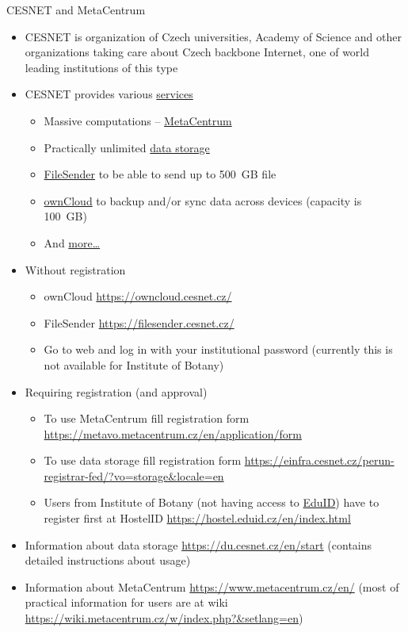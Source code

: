 \documentclass[compress, ucs, xelatex, 11pt, xcolor=svgnames,
  hyperref={
    bookmarks=true,
    unicode=true,
    colorlinks=true,
    pdftitle={Linux, command line and MetaCentrum},
    plainpages=false,
    pdfauthor={Vojtech Zeisek},
    pdfsubject={Course about use of Linux command line, writing shell scripts and using MetaCentrum of CESNET},
    pdfcreator={XeLaTeX},
    pdfkeywords={Linux, GNU, BASH, shell, command line, MetaCentrum},
    linkcolor=Red,
    anchorcolor=Blue,
    citecolor=Purple,
    filecolor=DodgerBlue,
    menucolor=DarkOrchid,
    urlcolor=DeepSkyBlue,
    pdftex},
  url={hyphens, lowtilde} %
  ]{beamer}
\begin{document}
\begin{frame}[allowframebreaks]{CESNET and MetaCentrum}
\begin{itemize}
  \item CESNET is organization of Czech universities, Academy of Science and other organizations taking care about Czech backbone Internet, one of world leading institutions of this type
  \item CESNET provides various \href{https://www.cesnet.cz/services/?lang=en}{services}
  \begin{itemize}
    \item Massive computations -- \href{https://www.cesnet.cz/services/massive-computations-metacentrum/?lang=en}{MetaCentrum}
    \item Practically unlimited \href{https://www.cesnet.cz/services/data-storage/?lang=en}{data storage}
    \item \href{https://www.cesnet.cz/services/filesender/?lang=en}{FileSender} to be able to send up to 500~GB file
    \item \href{https://www.cesnet.cz/services/owncloud/?lang=en}{ownCloud} to backup and/or sync data across devices (capacity is 100~GB)
    \item And \href{https://www.cesnet.cz/services/?lang=en}{more\ldots}
  \end{itemize}
  \item Without registration
  \begin{itemize}
    \item ownCloud \url{https://owncloud.cesnet.cz/}
    \item FileSender \url{https://filesender.cesnet.cz/}
    \item Go to web and log in with your institutional password (currently this is not available for Institute of Botany)
  \end{itemize}
  \item Requiring registration (and approval)
  \begin{itemize}
    \item To use MetaCentrum fill registration form \url{https://metavo.metacentrum.cz/en/application/form}
    \item To use data storage fill registration form \url{https://einfra.cesnet.cz/perun-registrar-fed/?vo=storage&locale=en}
    \item Users from Institute of Botany (not having access to \href{https://www.eduid.cz/en/index}{EduID}) have to register first at HostelID \url{https://hostel.eduid.cz/en/index.html}
  \end{itemize}
  \item Information about data storage \url{https://du.cesnet.cz/en/start} (contains detailed instructions about usage)
  \item Information about MetaCentrum \url{https://www.metacentrum.cz/en/} (most of practical information for users are at wiki \url{https://wiki.metacentrum.cz/w/index.php?&setlang=en})
\end{itemize}
\end{frame}
\end{document}
